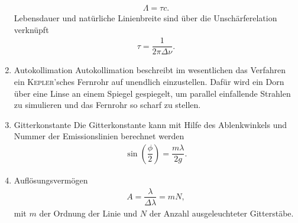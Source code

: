 \begin{enumerate}[label=--]
                \begin{align} 
                        \Lambda =\tau c
                .\end{align} 
                Lebensdauer und natürliche Linienbreite sind über die Unschärferelation verknüpft
                \begin{align} 
                        \tau =\dfrac{1}{2\pi \Delta \nu }
                .\end{align} 
        \item Autokollimation \hspace{25pt}
                Autokollimation beschreibt im wesentlichen das Verfahren ein \textsc{Kepler}'sches Fernrohr auf unendlich einzustellen.
                Dafür wird ein Dorn über eine Linse an einem Spiegel gespiegelt, um parallel einfallende Strahlen zu simulieren und das Fernrohr so scharf zu stellen.
        \item Gitterkonstante \hspace{25pt}
                Die Gitterkonstante kann mit Hilfe des Ablenkwinkels und Nummer der Emissionslinien berechnet werden
                \begin{align} 
                        \sin \left(\dfrac{\phi }{2}\right)=\dfrac{m\lambda }{2g}
                .\end{align} 
        \item Auflösungsvermögen \hspace{25pt}
                \begin{align} 
                        A=\dfrac{\lambda }{\Delta \lambda }=mN
                ,\end{align} 
                mit $m$ der Ordnung der Linie und $N$ der Anzahl ausgeleuchteter Gitterstäbe.
\end{enumerate}

\newpage
